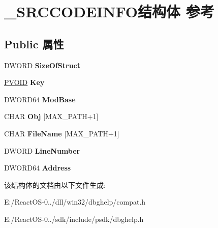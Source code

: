 \hypertarget{struct___s_r_c_c_o_d_e_i_n_f_o}{}\section{\+\_\+\+S\+R\+C\+C\+O\+D\+E\+I\+N\+F\+O结构体 参考}
\label{struct___s_r_c_c_o_d_e_i_n_f_o}
\subsection*{Public 属性}
\begin{DoxyCompactItemize}
\item 
\mbox{\label{struct___s_r_c_c_o_d_e_i_n_f_o_ab41c3acf0a5943777c3f262c38cfe6fe}} 
D\+W\+O\+RD {\bfseries Size\+Of\+Struct}
\item 
\mbox{\label{struct___s_r_c_c_o_d_e_i_n_f_o_a1ad73370f4a82e1ab9150c1429dcc8bc}} 
\hyperlink{interfacevoid}{P\+V\+O\+ID} {\bfseries Key}
\item 
\mbox{\label{struct___s_r_c_c_o_d_e_i_n_f_o_a5c14db5655235c83bd5b86660b1554ff}} 
D\+W\+O\+R\+D64 {\bfseries Mod\+Base}
\item 
\mbox{\label{struct___s_r_c_c_o_d_e_i_n_f_o_a500fc2b08a3d5eac1e70e8e58bc1fc20}} 
C\+H\+AR {\bfseries Obj} \mbox{[}M\+A\+X\+\_\+\+P\+A\+TH+1\mbox{]}
\item 
\mbox{\label{struct___s_r_c_c_o_d_e_i_n_f_o_a46c76d3d02701bb786fdd7407637200a}} 
C\+H\+AR {\bfseries File\+Name} \mbox{[}M\+A\+X\+\_\+\+P\+A\+TH+1\mbox{]}
\item 
\mbox{\label{struct___s_r_c_c_o_d_e_i_n_f_o_a364c27ffb213f039c3fda65c1024666c}} 
D\+W\+O\+RD {\bfseries Line\+Number}
\item 
\mbox{\label{struct___s_r_c_c_o_d_e_i_n_f_o_af0ff30e7498e022649fd5bf8ff9ad83e}} 
D\+W\+O\+R\+D64 {\bfseries Address}
\end{DoxyCompactItemize}


该结构体的文档由以下文件生成\+:\begin{DoxyCompactItemize}
\item 
E\+:/\+React\+O\+S-\/0../dll/win32/dbghelp/compat.\+h\item 
E\+:/\+React\+O\+S-\/0../sdk/include/psdk/dbghelp.\+h\end{DoxyCompactItemize}
